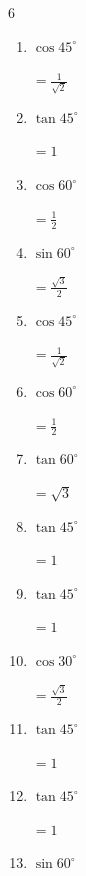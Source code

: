 \begin{multicols}{6}
\begin{enumerate}
        $\displaystyle =\frac{\sqrt{3}}{2}$

  \item $\displaystyle \cos{45^\circ}$

        $\displaystyle =\frac{1}{\sqrt{2}}$

  \item $\displaystyle \tan{45^\circ}$

        $\displaystyle =1$

  \item $\displaystyle \cos{60^\circ}$

        $\displaystyle =\frac{1}{2}$

  \item $\displaystyle \sin{60^\circ}$

        $\displaystyle =\frac{\sqrt{3}}{2}$

\columnbreak %

  \item $\displaystyle \cos{45^\circ}$

        $\displaystyle =\frac{1}{\sqrt{2}}$

  \item $\displaystyle \cos{60^\circ}$

        $\displaystyle =\frac{1}{2}$

  \item $\displaystyle \tan{60^\circ}$

        $\displaystyle =\sqrt{3}$

  \item $\displaystyle \tan{45^\circ}$

        $\displaystyle =1$

  \item $\displaystyle \tan{45^\circ}$

        $\displaystyle =1$

  \item $\displaystyle \cos{30^\circ}$

        $\displaystyle =\frac{\sqrt{3}}{2}$

  \item $\displaystyle \tan{45^\circ}$

        $\displaystyle =1$

  \item $\displaystyle \tan{45^\circ}$

        $\displaystyle =1$

  \item $\displaystyle \sin{60^\circ}$


\end{enumerate}
\end{multicols}
